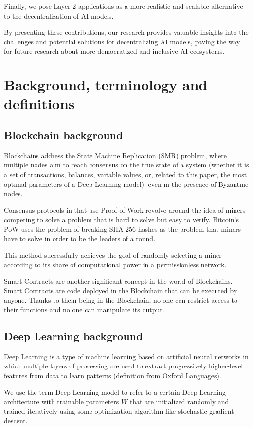 \documentclass[conference]{IEEEtran}
\begin{document}
Finally, we pose Layer-2 applications as a more realistic and scalable alternative to the decentralization of AI models.

By presenting these contributions, our research provides valuable insights into the challenges and potential solutions for decentralizing AI models, paving the way for future research about more democratized and inclusive AI ecosystems.

\section{Background, terminology and definitions}
\subsection{Blockchain background}
Blockchains address the State Machine Replication (SMR) problem, where multiple nodes aim to reach consensus on the true state of a system (whether it is a set of transactions, balances, variable values, or, related to this paper, the most optimal parameters of a Deep Learning model), even in the presence of Byzantine nodes.

Consensus protocols in that use Proof of Work revolve around the idea of miners competing to solve a problem that is hard to solve but easy to verify. Bitcoin's PoW uses the problem of breaking SHA-256 hashes as the problem that miners have to solve in order to be the leaders of a round.

This method successfully achieves the goal of randomly selecting a miner according to its share of computational power in a permissionless network.

Smart Contracts are another significant concept in the world of Blockchains. Smart Contracts are code deployed in the Blockchain that can be executed by anyone. Thanks to them being in the Blockchain, no one can restrict access to their functions and no one can manipulate its output.

\subsection{Deep Learning background}
Deep Learning is a type of machine learning based on artificial neural networks in which multiple layers of processing are used to extract progressively higher-level features from data to learn patterns (definition from Oxford Languages).

We use the term Deep Learning model to refer to a certain Deep Learning architecture with trainable parameters $W$ that are initialized randomly and trained iteratively using some optimization algorithm like stochastic gradient descent.
\end{document}
